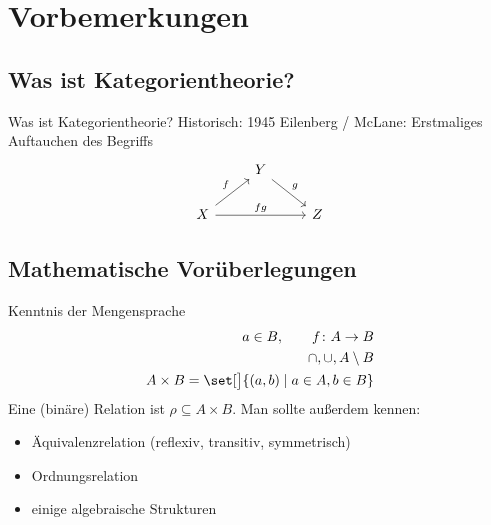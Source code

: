
\chapter{Vorbemerkungen}
\section{Was ist Kategorientheorie?}
Was ist Kategorientheorie?\nl
Historisch:
1945 Eilenberg / McLane: Erstmaliges Auftauchen des Begriffs
$$\begin{tikzcd}
                                   & Y \arrow[rd, "g"] &   \\
X \arrow[ru, "f"] \arrow[rr, "fg"] &                   & Z
			\end{tikzcd}
$$

\section{Mathematische Vorüberlegungen}
Kenntnis der Mengensprache
\begin{align*}
	a\in B,\qquad f\colon A\to B\\
	\cap,\cup,A\setminus B\\
	A\times B=\set[\big]{(a,b)\mid a\in A,b\in B}
\end{align*}
Eine (binäre) Relation ist $\rho\subseteq A\times B$.
Man sollte außerdem kennen:
\begin{itemize}
	\item Äquivalenzrelation (reflexiv, transitiv, symmetrisch)
	\item Ordnungsrelation %
	\item einige algebraische Strukturen
\end{itemize}

